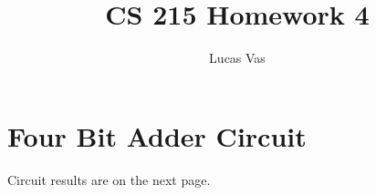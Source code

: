 \documentclass[12pt]{article}
\begin{document}
\title{CS 215 Homework 4}
\author{Lucas Vas}
\maketitle

\section*{Four Bit Adder Circuit}

Circuit results are on the next page.
\end{document}
